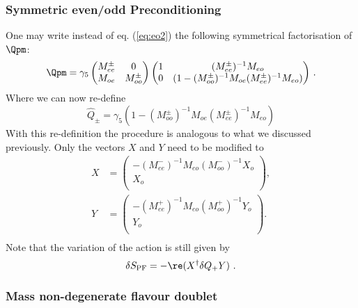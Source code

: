 \subsubsection{Symmetric even/odd Preconditioning}

One may write instead of eq. (\ref{eq:eo2}) the following symmetrical
factorisation of $\Qpm$:
\begin{equation}
  \label{eq:sym1}
  \Qpm =
  \gamma_5\begin{pmatrix}
    M_{ee}^\pm & 0 \\
    M_{oe}  &  M_{oo}^\pm \\
  \end{pmatrix}
  \begin{pmatrix}
    1       & (M_{ee}^\pm)^{-1}M_{eo}\\
    0       & (1-(M_{oo}^\pm)^{-1} M_{oe} (M_{ee}^\pm)^{-1} M_{eo})\\
  \end{pmatrix}\, .
\end{equation}
Where we can now re-define
\begin{equation}
  \label{eq:sym2}
  \hat Q_\pm = \gamma_5(1-(M_{oo}^\pm)^{-1} M_{oe} (M_{ee}^\pm)^{-1}
  M_{eo}) 
\end{equation}
With this re-definition the procedure is analogous to what we
discussed previously. Only the vectors $X$ and $Y$ need to be modified
to  
\begin{equation}
  \begin{split}
    \label{eq:sym9}
    X &= 
    \begin{pmatrix}
      -(M_{ee}^-)^{-1}M_{eo}(M_{oo}^-)^{-1}X_o \\ X_o\\
    \end{pmatrix},\\
    Y &= 
    \begin{pmatrix}
      -(M_{ee}^+)^{-1}M_{eo}(M_{oo}^+)^{-1}Y_o \\ Y_o\\
    \end{pmatrix}.\\
  \end{split}
\end{equation}
Note that the variation of the action is still given by
\begin{equation}
  \label{eq:sym3}
  \delta S_\mathrm{PF} = -\re(X^\dagger \delta Q_+ Y)\ .
\end{equation}

\subsubsection{Mass non-degenerate flavour doublet}

